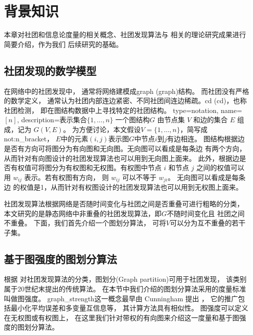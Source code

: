 
\chapter{背景知识}\label{chp:knowledge}
本章对社团和信息论度量的相关概念、社团发现算法与
相关的理论研究成果进行简要介绍，作为我们
后续研究的基础。
\section{社团发现的数学模型}\label{sec:community_detection}

在网络中的社团发现中，
通常将网络建模成\gls{graph} (\glsdesc{graph})结构。
而社团没有严格的数学定义，
通常认为社团内部连边紧密、不同社团间连边稀疏。\gls{cd} (\glsdesc{cd})，也称社团检测，
即在图结构数据中上寻找特定的社团结构。
{
  type=notation,
  name={\ensuremath{[n]}},
  description={表示集合$\{1,\dots, n\}$}
}
一个图结构$G$ 由节点集 $V$ 和边的集合 $E$ 组成，记为 $G(V,E)$。
为方便讨论，本文假设$V=\{1,\dots, n\}$，简写成 \gls{not:n_bracket}，
$E$中的元素$(i,j)$表示图$G$中节点$i$到$j$有边相连。
图结构根据边是否有方向可将图分为有向图和无向图。无向图可以看成是每条边
有两个方向，从而针对有向图设计的社团发现算法也可以用到无向图上面来。
此外，根据边是否有权值可将图分为有权图和无权图。有权图中节点 $i$
和节点 $j$ 之间的权值可以用 $w_{ij}$ 表示。若有权图有方向，
则 $w_{ij}$ 可以不等于 $w_{ji}$。
无向图可以看成是每条边
的权值是1，从而针对有权图设计的社团发现算法也可以用到无权图上面来。

社团发现算法根据网络是否随时间变化与社团之间是否重叠可进行粗略的分类，
本文研究的是静态网络中非重叠的社团发现算法，即$G$不随时间变化且
社团之间不重叠。
下面，我们首先介绍一个图划分算法，
可将$V$可以分为互不重叠的若干子集。

\section{基于图强度的图划分算法}\label{sec:graph_strength}
根据\citet{fortunato2010community} 对社团发现算法的分类，图划分(Graph partition)可用于社团发现，
该类别属于20世纪末提出的传统算法。
在本节中我们介绍的图划分算法采用的度量标准叫做图强度。
\gls{graph_strength}这一概念最早由 Cunningham 提出 \cite{cunningham1985optimal}，
它的推广包括最小化平均误差\cite{mac}和多变量互信息\cite{chan2016ic}等，
其计算方法具有相似性。
图强度可以定义在无权图或有权图上，
在这里我们针对带权的有向图来介绍这一度量和基于图强度的图划分算法。

